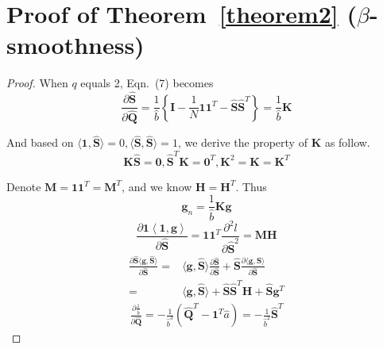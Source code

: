 \documentclass[sigconf]{acmart}
\begin{document}
\section{Proof of Theorem~\ref{theorem2} ($\beta$-smoothness)}
\label{sec:supp_d}
\begin{proof}
When $q$ equals 2, Eqn.~(7) becomes
\begin{equation}
    \frac{\partial \hat{\mathbf{S}}}{\partial \hat{\mathbf{Q}}} = \frac{1}{\hat{b}}\left\{\mathbf{I}-\frac{1}{N}\mathbf{1}\mathbf{1}^T-\hat{\mathbf{S}}\hat{\mathbf{S}}^T\right\}=\frac{1}{\hat{b}}\mathbf{K}
\end{equation}

And based on $\langle\mathbf{1}, \hat{\mathbf{S}}\rangle=0, \langle\hat{\mathbf{S}}, \hat{\mathbf{S}}\rangle=1$, we derive the property of $\mathbf{K}$ as follow.
\begin{equation}
    \mathbf{K}\hat{\mathbf{S}}=\mathbf{0},\hat{\mathbf{S}}^T\mathbf{K}=\mathbf{0}^T, \mathbf{K}^2=\mathbf{K}=\mathbf{K}^T
\end{equation}

Denote $\mathbf{M}= \mathbf{1}\mathbf{1}^T=\mathbf{M}^T$, and we know $\mathbf{H}=\mathbf{H}^T$. Thus
\begin{equation}
    \mathbf{g}_n=\frac{1}{\hat{b}}\mathbf{K}{\mathbf{g}}
\end{equation}
\begin{equation}
    \frac{\partial \mathbf{1}\left\langle\mathbf{1}, {\mathbf{g}}\right\rangle}{\partial \hat{\mathbf{S}}} =  \mathbf{1}\mathbf{1}^T\frac{\partial^2 l}{\partial \hat{\mathbf{S}}^2}=\mathbf{M}\mathbf{H}
\end{equation}
\begin{align}
    \frac{\partial \hat{\mathbf{S}}\langle{\mathbf{g}},\hat{\mathbf{S}}\rangle}{\partial \hat{\mathbf{S}}} =& \langle{\mathbf{g}},\hat{\mathbf{S}}\rangle\frac{\partial \hat{\mathbf{S}}}{\partial \hat{\mathbf{S}}} + \hat{\mathbf{S}}\frac{\partial \langle{\mathbf{g}},\hat{\mathbf{S}}\rangle}{\partial \hat{\mathbf{S}}}\nonumber\\
    =& \langle{\mathbf{g}},\hat{\mathbf{S}}\rangle + \hat{\mathbf{S}}\hat{\mathbf{S}}^T\mathbf{H}+\hat{\mathbf{S}}{\mathbf{g}}^T
\end{align}
\begin{align}
    \frac{\partial \frac{1}{\hat{b}}}{\partial \hat{\mathbf{Q}}} = -\frac{1}{\hat{b}^3}(\hat{\mathbf{Q}}^T-\mathbf{1}^T\hat{a})=-\frac{1}{\hat{b}^2}\hat{\mathbf{S}}^T
\end{align}


\end{proof}
\end{document}
